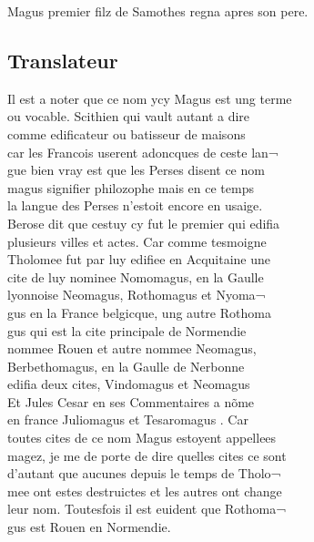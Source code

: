 \documentclass[12pt]{article}
\begin{document}
Magus premier filz de Samothes regna apres son pere.





\subsection*{Translateur}


\newpage
Il est a noter que ce nom ycy
            Magus est ung terme\\
ou vocable. Scithien qui
          vault autant a dire\\
comme edificateur ou batisseur de maisons\\
car les
          Francois userent adoncques de ceste lan¬\\
gue bien vray est que les Perses disent
          ce nom\\
magus signifier philozophe mais en ce temps\\
la langue des
          Perses n'estoit encore en usaige.\\
Berose dit
          que cestuy cy fut le premier qui edifia\\
plusieurs villes et actes. Car comme
            tesmoigne\\
Tholomee fut par luy edifiee
          en Acquitaine une\\
cite de luy nominee Nomomagus, en la Gaulle\\
lyonnoise Neomagus, Rothomagus et Nyoma¬\\
gus en la France belgicque, ung
          autre Rothoma\\
gus qui est la cite principale de Normendie\\
nommee
          Rouen et autre nommee Neomagus,\\
Berbethomagus, en la Gaulle de Nerbonne\\
edifia deux cites, Vindomagus et Neomagus\\
Et  Jules Cesar  en ses Commentaires a nõme\\
en france Juliomagus et Tesaromagus . Car\\
toutes cites de ce nom Magus estoyent appellees\\
magez, je me de porte
          de dire quelles cites ce sont\\
d'autant que aucunes depuis le temps de Tholo¬\\
mee ont estes destruictes et les autres ont
            change\\
leur nom. Toutesfois il est euident que Rothoma¬\\
gus est
          Rouen en Normendie.
\end{document}

